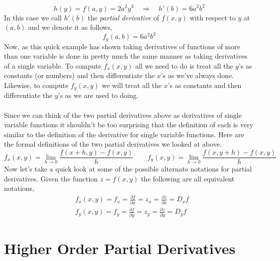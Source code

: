 \documentclass[10pt,reqno]{book}
\theoremstyle{definition}
\begin{document}
	\[ h(y) = f(a,y) = 2a^2y^3 \quad \Rightarrow \quad  h'(b) = 6a^2 b^2 \]
	In this case we call $ h'(b) $ the \textit{partial derivative} of $ f(x,y) $ with respect to $ y $ at $ (a,b) $ and we denote it as follows,
	\[ f_y(a,b) = 6a^2b^2 \]
	Now, as this quick example has shown taking derivatives of functions of more than one variable is done in pretty much the same manner as taking derivatives of a single variable. To compute $ f_x(x,y) $ all we need to do is treat all the $ y $'s as constants (or numbers) and then differentiate the $ x $'s as we've always done. Likewise, to compute $ f_y(x,y) $ we will treat all the $ x $'s as constants and then differentiate the $ y $'s as we are used to doing.\\ \\
	Since we can think of the two partial derivatives above as derivatives of single variable functions it shouldn't be too surprising that the definition of each is very similar to the definition of the derivative for single variable functions. Here are the formal definitions of the two partial derivatives we looked at above.
	\[ f_x(x,y) = \lim_{h \to 0} \frac{f(x+h,y) - f(x,y)}{h} \qquad f_y(x,y) = \lim_{h \to 0} \frac{f(x,y+h) - f(x,y)}{h} \]
	Now let's take a quick look at some of the possible alternate notations for partial derivatives. Given the function $ z = f(x,y) $ the following are all equivalent notations,
	\begin{align*}
		& f_x(x,y) = f_x = \frac{\partial f}{\partial x} = z_x = \frac{\partial z}{\partial x} = D_x f\\
		& f_y(x,y) = f_y = \frac{\partial f}{\partial y} = z_y = \frac{\partial z}{\partial y} = D_y f
	\end{align*}
	
	\section{Higher Order Partial Derivatives}
	
\end{document}
